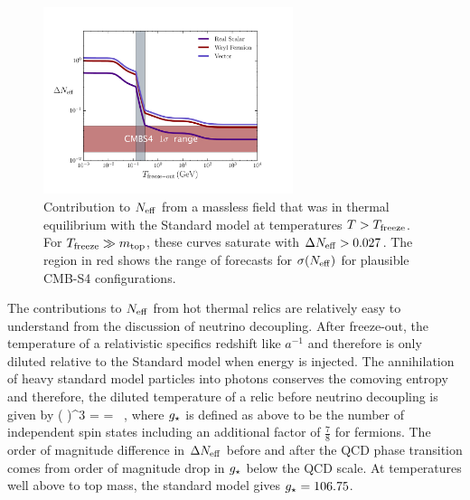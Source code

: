 \begin{figure}[t!]
\begin{center}
\includegraphics[width=0.65\textwidth]{Neutrinos/Neff.pdf}
\caption{Contribution to $N_{\rm eff}$ from a massless field that was in thermal equilibrium with the Standard model at temperatures $T> T_{\rm freeze}$.  For $T_{\rm freeze} \gg m_{\rm top}$, these curves saturate with $\Delta N_{\rm eff} > 0.027$.   The region in red shows the range of forecasts for $\sigma(N_{\rm eff})$ for plausible CMB-S4 configurations. }
\label{fig:limits}
\end{center}
\end{figure} 

The contributions to $N_{\rm eff}$ from hot thermal relics are relatively easy to understand from the discussion of neutrino decoupling.  After freeze-out, the temperature of a relativistic specifics redshift like $a^{-1}$ and therefore is only diluted relative to the Standard model when energy is injected.  The annihilation of heavy standard model particles into photons conserves the comoving entropy and therefore, the diluted temperature of a relic before neutrino decoupling is given by
\beq
\left(  \right)^3 = =  \, ,
\eeq
where $g_{\star}$ is defined as above to be the number of independent spin states including an additional factor of $\frac{7}{8}$ for fermions.  The order of magnitude difference in $\Delta N_{\rm eff}$ before and after the QCD phase transition comes from order of magnitude drop in $g_{\star}$ below the QCD scale.  At temperatures well above to top mass, the standard model gives $g_{\star} = 106.75$.  

